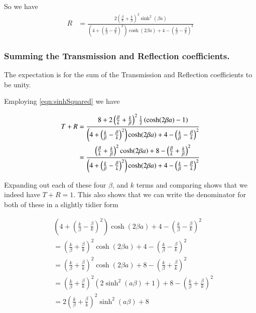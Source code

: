 \documentclass{article}
\begin{document}
So we have
\begin{align}\label{eqn:Rcoeff1}
R 
&= \frac{2 
\left(\frac{\beta}{k} + \frac{k}{\beta} \right)^2 
\sinh^2( \beta a)} { 
\left(4 + \left( \frac{k}{\beta} -\frac{\beta}{k} \right)^2 \right)
\cosh(2\beta a)
+ 
4 - \left(\frac{k}{\beta} - \frac{\beta}{k} \right)^2 
}
\end{align}

\subsubsection{ Summing the Transmission and Reflection coefficients. }

The expectation is for the 
sum of the Transmission and Reflection coefficients to be unity.

Employing \ref{eqn:sinhSquared} we have

\begin{align*}
T + R 
&= \frac{8 + 2 
\left(\frac{\beta}{k} + \frac{k}{\beta} \right)^2 
\frac{1}{2} \left( \cosh(2 \beta a) -1 \right) 
} { 
\left(4 + \left( \frac{k}{\beta} -\frac{\beta}{k} \right)^2 \right)
\cosh(2\beta a)
+ 
4 - \left(\frac{k}{\beta} - \frac{\beta}{k} \right)^2 
} \\
&= \frac{ 
\left(\frac{\beta}{k} + \frac{k}{\beta} \right)^2 
\cosh(2 \beta a) + 8 - \left(\frac{\beta}{k} + \frac{k}{\beta} \right)^2 
} { 
\left(4 + \left( \frac{k}{\beta} -\frac{\beta}{k} \right)^2 \right)
\cosh(2\beta a)
+ 
4 - \left(\frac{k}{\beta} - \frac{\beta}{k} \right)^2 
} \\
\end{align*}

Expanding out each of these four $\beta$, and $k$ terms and comparing shows that
we indeed have $T + R = 1$.  This also shows that we can write the denominator for both of
these 
in a 
slightly tidier form

\begin{align*}
&\left(4 + \left( \frac{k}{\beta} -\frac{\beta}{k} \right)^2 \right)
\cosh(2\beta a)
+ 
4 - \left(\frac{k}{\beta} - \frac{\beta}{k} \right)^2  \\
&=
\left( \frac{k}{\beta} +\frac{\beta}{k} \right)^2 
\cosh(2\beta a)
+ 
4 - \left(\frac{k}{\beta} - \frac{\beta}{k} \right)^2  \\
&=
\left( \frac{k}{\beta} +\frac{\beta}{k} \right)^2 
\cosh(2\beta a)
+ 
8 - \left(\frac{k}{\beta} + \frac{\beta}{k} \right)^2  \\
&=
\left( \frac{k}{\beta} +\frac{\beta}{k} \right)^2 
\left( 2 \sinh^2(a \beta) + 1\right)
+ 
8 - \left(\frac{k}{\beta} + \frac{\beta}{k} \right)^2  \\
&=
2 \left( \frac{k}{\beta} +\frac{\beta}{k} \right)^2 
\sinh^2(a \beta) + 8 \\
\end{align*}
\end{document}
